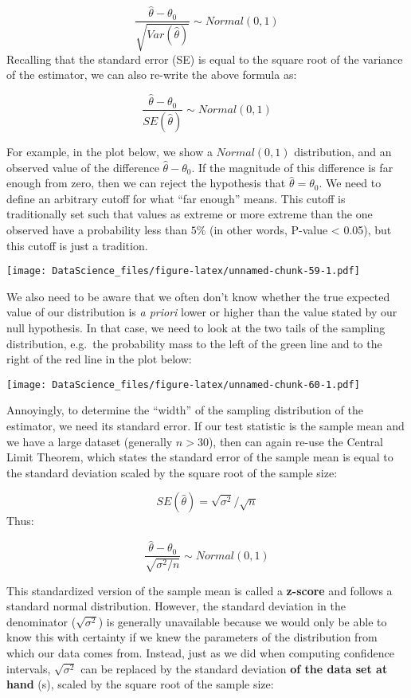 \documentclass[
]{book}
\begin{document}
\[\frac{\hat{\theta} - \theta_0}{\sqrt{Var(\hat{\theta})}} \sim Normal(0, 1)\]
Recalling that the standard error (SE) is equal to the square root of the variance of the estimator, we can also re-write the above formula as:

\[\frac{\hat{\theta} - \theta_0}{SE(\hat{\theta})} \sim Normal(0, 1)\]

For example, in the plot below, we show a \(Normal(0,1)\) distribution, and an observed value of the difference \(\hat{\theta}-\theta_0\). If the magnitude of this difference is far enough from zero, then we can reject the hypothesis that \(\hat{\theta} = \theta_0\). We need to define an arbitrary cutoff for what ``far enough'' means. This cutoff is traditionally set such that values as extreme or more extreme than the one observed have a probability less than \(5\%\) (in other words, P-value \textless{} 0.05), but this cutoff is just a tradition.

\texttt{[image: DataScience\_files/figure-latex/unnamed-chunk-59-1.pdf]}

We also need to be aware that we often don't know whether the true expected value of our distribution is \emph{a priori} lower or higher than the value stated by our null hypothesis. In that case, we need to look at the two tails of the sampling distribution, e.g.~the probability mass to the left of the green line and to the right of the red line in the plot below:

\texttt{[image: DataScience\_files/figure-latex/unnamed-chunk-60-1.pdf]}

Annoyingly, to determine the ``width'' of the sampling distribution of the estimator, we need its standard error. If our test statistic is the sample mean and we have a large dataset (generally \(n>30\)), then can again re-use the Central Limit Theorem, which states the standard error of the sample mean is equal to the standard deviation scaled by the square root of the sample size:

\[SE(\hat{\theta}) = \sqrt{\sigma^2}/\sqrt{n}\]
Thus:

\[\frac{\hat{\theta} - \theta_0}{\sqrt{\sigma^2/n}} \sim Normal(0, 1)\]

This standardized version of the sample mean is called a \textbf{z-score} and follows a standard normal distribution. However, the standard deviation in the denominator (\(\sqrt{\sigma^2}\)) is generally unavailable because we would only be able to know this with certainty if we knew the parameters of the distribution from which our data comes from. Instead, just as we did when computing confidence intervals, \(\sqrt{\sigma^2}\) can be replaced by the standard deviation \textbf{of the data set at hand} (s), scaled by the square root of the sample size:
\end{document}
